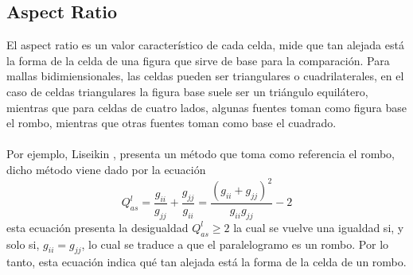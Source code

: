 \documentclass[letterpaper, openright, 12pt]{book}
\begin{document}
    \subsection*{Aspect Ratio}
    El aspect ratio es un valor característico de cada celda, mide que tan
    alejada está la forma de la celda de una figura que sirve de base para
    la comparación. Para mallas bidimiensionales, las celdas pueden ser
    triangulares o cuadrilaterales, en el caso de celdas triangulares la
    figura base suele ser un triángulo equilátero, mientras que para celdas
    de cuatro lados, algunas fuentes toman como figura base el rombo, mientras
    que otras fuentes toman como base el cuadrado.

    \paragraph*{}
    Por ejemplo, Liseikin \cite{vladimir-grid}, presenta un método que toma
    como referencia el rombo, dicho método viene dado por la ecuación
    \begin{equation}
        Q_{as}^{l} = \frac{g_{ii}}{g_{jj}} + \frac{g_{jj}}{g_{ii}}
            = \frac{\left( g_{ii} + g_{jj} \right)^2}{g_{ii} g_{jj}} - 2
    \end{equation}
    esta ecuación presenta la desigualdad $Q_{as}^{l} \geq 2$ la cual se
    vuelve una igualdad si, y solo si, $g_{ii} = g_{jj}$, lo cual se traduce
    a que el paralelogramo es un rombo. Por lo tanto, esta ecuación
    indica qué tan alejada está la forma de la celda de un rombo.
\end{document}
